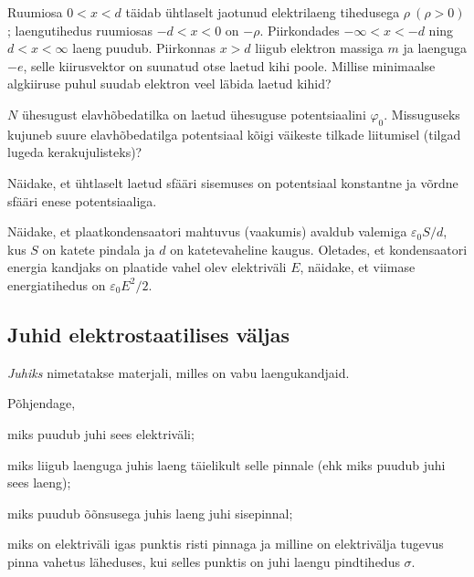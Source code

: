 \documentclass[a4paper,11pt,twocolumn]{article}
\begin{document}
\begin{question}
Ruumiosa \( 0 < x < d \) täidab ühtlaselt jaotunud elektrilaeng tihedusega \( \rho \ (\rho>0)\); laengutihedus ruumiosas \( - d < x < 0 \) on \( -\rho \). Piirkondades \( - \infty < x < -d \) ning \( d < x < \infty \) laeng puudub. Piirkonnas \( x > d \) liigub elektron massiga \( m \) ja laenguga \( -e \), selle kiirusvektor on suunatud otse laetud kihi poole. Millise minimaalse algkiiruse puhul suudab elektron veel läbida laetud kihid?
\end{question}

\begin{question}
\( N \) ühesugust elavhõbedatilka on laetud ühesuguse potentsiaalini \( \varphi_0 \). Missuguseks kujuneb suure elavhõbedatilga potentsiaal kõigi väikeste tilkade liitumisel (tilgad lugeda kerakujulisteks)?
\end{question}

\begin{question}
Näidake, et ühtlaselt laetud sfääri sisemuses on potentsiaal konstantne ja võrdne sfääri enese potentsiaaliga.
\end{question}

\begin{question}
Näidake, et plaatkondensaatori mahtuvus (vaakumis) avaldub valemiga \(\varepsilon_0 S/d\), kus \(S\) on katete pindala ja \(d\) on katetevaheline kaugus. Oletades, et kondensaatori energia kandjaks on plaatide vahel olev elektriväli \(E\), näidake, et viimase energiatihedus on \(\varepsilon_0 E^2/2\).
\end{question}

\subsection{Juhid elektrostaatilises väljas}
\textit{Juhiks} nimetatakse materjali, milles on vabu laengukandjaid.
\begin{question}
    Põhjendage,
    \begin{subquestion}
    \item miks puudub juhi sees elektriväli;
    \item miks liigub laenguga juhis laeng täielikult selle pinnale (ehk miks puudub juhi sees laeng);
    \item miks puudub õõnsusega juhis laeng juhi sisepinnal;
    \item miks on elektriväli igas punktis risti pinnaga ja milline on elektrivälja tugevus pinna vahetus läheduses, kui selles punktis on juhi laengu pindtihedus $\sigma$.
    \end{subquestion}
\end{question}
\end{document}
